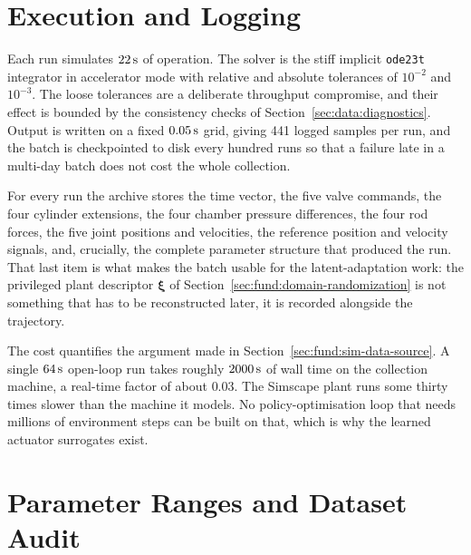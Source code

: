 \section{Execution and Logging}

Each run simulates $\unit[22]{s}$ of operation. The solver is the stiff
implicit \texttt{ode23t} integrator in accelerator mode with relative
and absolute tolerances of $10^{-2}$ and $10^{-3}$. The loose tolerances
are a deliberate throughput compromise, and their effect is bounded by
the consistency checks of Section~\ref{sec:data:diagnostics}. Output is
written on a fixed $\unit[0.05]{s}$ grid, giving 441 logged samples per
run, and the batch is checkpointed to disk every hundred runs so that a
failure late in a multi-day batch does not cost the whole collection.

For every run the archive stores the time vector, the five valve
commands, the four cylinder extensions, the four chamber pressure
differences, the four rod forces, the five joint positions and
velocities, the reference position and velocity signals, and, crucially,
the complete parameter structure that produced the run. That last item
is what makes the batch usable for the latent-adaptation work: the
privileged plant descriptor $\bm{\xi}$ of
Section~\ref{sec:fund:domain-randomization} is not something that has to
be reconstructed later, it is recorded alongside the trajectory.

The cost quantifies the argument made in
Section~\ref{sec:fund:sim-data-source}. A single
$\unit[64]{s}$ open-loop run takes roughly $\unit[2000]{s}$ of wall time
on the collection machine, a real-time factor of about $0.03$. The
Simscape plant runs some thirty times slower than the machine it
models. No policy-optimisation loop that needs millions of environment
steps can be built on that, which is why the learned actuator
surrogates exist.



\section{Parameter Ranges and Dataset Audit}

